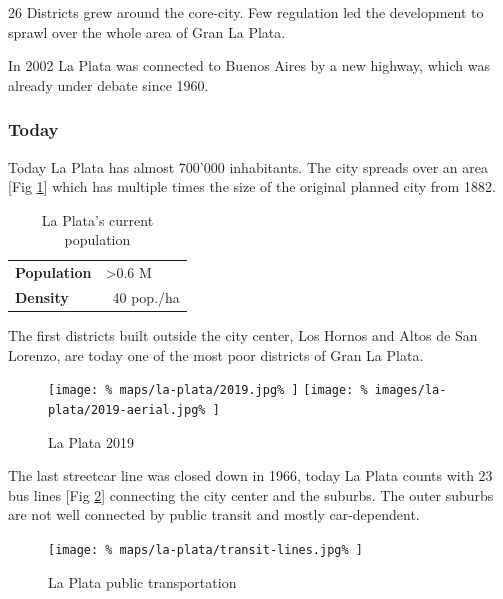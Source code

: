 \documentclass{article}
\begin{document}
\begin{multicols}{2}
			
			
			26 Districts grew around the core-city. Few regulation led the development to sprawl over the whole area of Gran La Plata.
			
			In 2002 La Plata was connected to Buenos Aires by a new highway, which was already under debate since 1960.		
			
			
			\newpage
			\subsubsection{Today}
			
			Today La Plata has almost 700'000 inhabitants. The city spreads over an area [Fig \ref{fig:map:la-plata-2019}] which has multiple times the size of the original planned city from 1882.
			
			\begin{table}[H]			
				\centering
				\caption{La Plata's current population}
				\label{table:la-plata-population}
				\begin{tabular}{|l|l|}
					\hline
					\textbf{Population} & \textgreater 0.6 M \\
					\textbf{Density}    & ~40 pop./ha \\
					\hline
				\end{tabular}
			\end{table}
			
			The first districts built outside the city center, Los Hornos and Altos de San Lorenzo, are today one of the most poor districts of Gran La Plata.
			
			\begin{figure}[H]
				\texttt{[image: \%
					maps/la-plata/2019.jpg\%
				]}
				\texttt{[image: \%
					images/la-plata/2019-aerial.jpg\%
				]}
				\caption{La Plata 2019 \cite{OpenStreetMap:LaPlata}}
				\label{fig:map:la-plata-2019}
			\end{figure}

			The last streetcar line was closed down in 1966, today La Plata counts with 23 bus lines [Fig \ref{fig:map:la-plata-transit}] connecting the city center and the suburbs.
			The outer suburbs are not well connected by public transit and mostly car-dependent.
			
			\begin{figure}[H]
				\texttt{[image: \%
					maps/la-plata/transit-lines.jpg\%
				]}
				\caption{La Plata public transportation  \cite{OpenStreetMap:LaPlata}}
				\label{fig:map:la-plata-transit}
			\end{figure}
			

\end{multicols}
\end{document}
